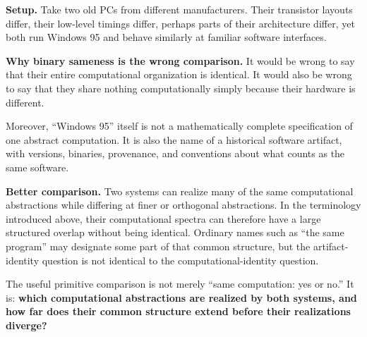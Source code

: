 \documentclass[11pt,a4paper]{article}
\newcounter{thought}
\newenvironment{thoughtbox}[1]{%
  \refstepcounter{thought}%
  \begin{tcolorbox}[
    enhanced,breakable,
    colback=white,colframe=navy,boxrule=0.85pt,
    arc=1.7mm,left=2.8mm,right=2.8mm,top=2.2mm,bottom=2.0mm,
    borderline west={2.2pt}{0pt}{blue},
    title={\large\bfseries Thought experiment \thethought: #1},
    fonttitle=\bfseries,coltitle=navy,
    attach boxed title to top left={xshift=2mm,yshift=-2mm},
    boxed title style={colback=sky,colframe=blue,boxrule=0.55pt,arc=1.2mm},
    before skip=9pt,after skip=10pt
  ]
}{\end{tcolorbox}}
\newcommand{\scene}{\medskip\textbf{Setup.} }
\begin{document}
\begin{thoughtbox}{When different computers run the same thing}
\scene Take two old PCs from different manufacturers. Their transistor layouts differ, their low-level timings differ, perhaps parts of their architecture differ, yet both run Windows 95 and behave similarly at familiar software interfaces.

\medskip\textbf{Why binary sameness is the wrong comparison.} It would be wrong to say that their entire computational organization is identical. It would also be wrong to say that they share nothing computationally simply because their hardware is different.

Moreover, ``Windows 95'' itself is not a mathematically complete specification of one abstract computation. It is also the name of a historical software artifact, with versions, binaries, provenance, and conventions about what counts as the same software.

\medskip\textbf{Better comparison.} Two systems can realize many of the same computational abstractions while differing at finer or orthogonal abstractions. In the terminology introduced above, their computational spectra can therefore have a large structured overlap without being identical. Ordinary names such as ``the same program'' may designate some part of that common structure, but the artifact-identity question is not identical to the computational-identity question.

\begin{conceptbox}
The useful primitive comparison is not merely ``same computation: yes or no.'' It is: \textbf{which computational abstractions are realized by both systems, and how far does their common structure extend before their realizations diverge?}
\end{conceptbox}
\end{thoughtbox}
\end{document}
